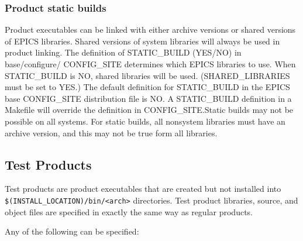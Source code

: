 \subsubsection{Product static builds}

Product executables can be linked with either archive versions or shared versions of EPICS libraries. Shared versions of 
system libraries will always be used in product linking. The definition of STATIC\_BUILD (YES/NO) in base/configure/
CONFIG\_SITE determines which EPICS libraries to use. When STATIC\_BUILD is NO, shared libraries will be used.  
(SHARED\_LIBRARIES must be set to YES.) The default definition for STATIC\_BUILD in the EPICS base 
CONFIG\_SITE distribution file is NO. A STATIC\_BUILD definition in a Makefile will override the definition in 
CONFIG\_SITE.Static builds may not be possible on all systems. For static builds, all nonsystem libraries must have an 
archive version, and this may not be true form all libraries.

\subsection{Test Products}

Test products are product executables that are created but not installed into \verb|$(INSTALL_LOCATION)/bin/<arch>| 
directories. Test product libraries, source, and object files are specified in exactly the same way as regular products. 

Any of the following can be specified:

